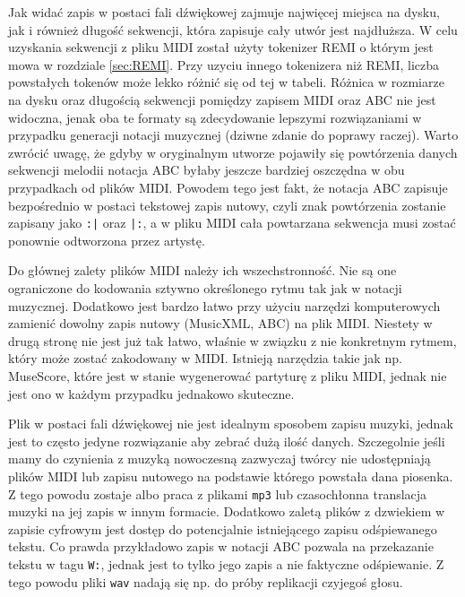 \documentclass[data-science]{agh-wi} %
\begin{document}
Jak widać zapis w postaci fali dźwiękowej zajmuje najwięcej miejsca na dysku, jak i również długość sekwencji, która zapisuje cały utwór jest najdłuższa. W celu uzyskania sekwencji z pliku MIDI został użyty tokenizer REMI o którym jest mowa w rozdziale \ref*{sec:REMI}. Przy uzyciu innego tokenizera niż REMI, liczba powstałych tokenów może lekko różnić się od tej w tabeli. Różnica w rozmiarze na dysku oraz długością sekwencji pomiędzy zapisem MIDI oraz ABC nie jest widoczna, jenak oba te formaty są zdecydowanie lepszymi rozwiązaniami w przypadku generacji notacji muzycznej (dziwne zdanie do poprawy raczej). Warto zwrócić uwagę, że gdyby w oryginalnym utworze pojawiły się powtórzenia danych sekwencji melodii notacja ABC byłaby jeszcze bardziej oszczędna w obu przypadkach od plików MIDI.  Powodem tego jest fakt, że notacja ABC zapisuje bezpośrednio w postaci tekstowej zapis nutowy, czyli znak powtórzenia zostanie zapisany jako \texttt{:|} oraz \texttt{|:}, a w pliku MIDI cała powtarzana sekwencja musi zostać ponownie odtworzona przez artystę.

Do głównej zalety plików MIDI należy ich wszechstronność. Nie są one ograniczone do kodowania sztywno określonego rytmu tak jak w notacji muzycznej. Dodatkowo jest bardzo łatwo przy użyciu narzędzi komputerowych zamienić dowolny zapis nutowy (MusicXML, ABC) na plik MIDI. Niestety w drugą stronę nie jest już tak łatwo, właśnie w związku z nie konkretnym rytmem, który może zostać zakodowany w MIDI. Istnieją narzędzia takie jak np. MuseScore, które jest w stanie wygenerować partyturę z pliku MIDI, jednak nie jest ono w każdym przypadku jednakowo skuteczne.

Plik w postaci fali dźwiękowej nie jest idealnym sposobem zapisu muzyki, jednak jest to często jedyne rozwiązanie aby zebrać dużą ilość danych. Szczegolnie jeśli mamy do czynienia z muzyką nowoczesną zazwyczaj twórcy nie udostępniają plików MIDI lub zapisu nutowego na podstawie którego powstała dana piosenka. Z tego powodu zostaje albo praca z plikami \texttt{mp3} lub czasochłonna translacja muzyki na jej zapis w innym formacie. Dodatkowo zaletą plików z dzwiekiem w zapisie cyfrowym jest dostęp do potencjalnie istniejącego zapisu odśpiewanego tekstu. Co prawda przykładowo zapis w notacji ABC pozwala na przekazanie tekstu w tagu \texttt{W:}, jednak jest to tylko jego zapis a nie faktyczne odśpiewanie. Z tego powodu pliki \texttt{wav} nadają się np. do próby replikacji czyjegoś głosu.
\end{document}
